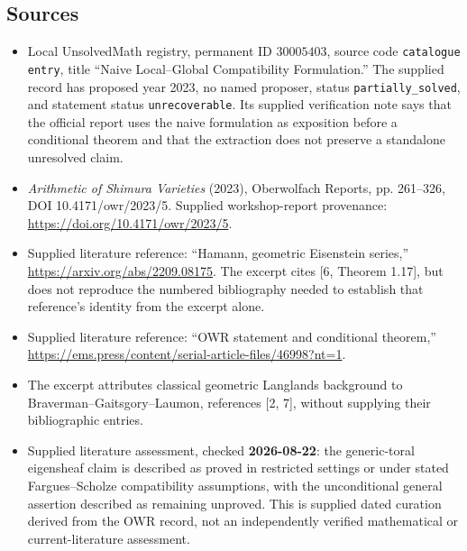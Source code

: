 \documentclass[11pt]{article}
\begin{document}
\subsection{Sources}
\begin{itemize}
\item Local UnsolvedMath registry, permanent ID \(30005403\), source code \texttt{catalogue entry}, title ``Naive Local--Global Compatibility Formulation.'' The supplied record has proposed year 2023, no named proposer, status \texttt{partially\_solved}, and statement status \texttt{unrecoverable}. Its supplied verification note says that the official report uses the naive formulation as exposition before a conditional theorem and that the extraction does not preserve a standalone unresolved claim.
\item \emph{Arithmetic of Shimura Varieties} (2023), Oberwolfach Reports, pp. 261--326, DOI 10.4171/owr/2023/5. Supplied workshop-report provenance: \url{https://doi.org/10.4171/owr/2023/5}.
\item Supplied literature reference: ``Hamann, geometric Eisenstein series,'' \url{https://arxiv.org/abs/2209.08175}. The excerpt cites [6, Theorem 1.17], but does not reproduce the numbered bibliography needed to establish that reference's identity from the excerpt alone.
\item Supplied literature reference: ``OWR statement and conditional theorem,'' \url{https://ems.press/content/serial-article-files/46998?nt=1}.
\item The excerpt attributes classical geometric Langlands background to Braverman--Gaitsgory--Laumon, references [2, 7], without supplying their bibliographic entries.
\item Supplied literature assessment, checked \textbf{2026-08-22}: the generic-toral eigensheaf claim is described as proved in restricted settings or under stated Fargues--Scholze compatibility assumptions, with the unconditional general assertion described as remaining unproved. This is supplied dated curation derived from the OWR record, not an independently verified mathematical or current-literature assessment.
\end{itemize}
\end{document}
